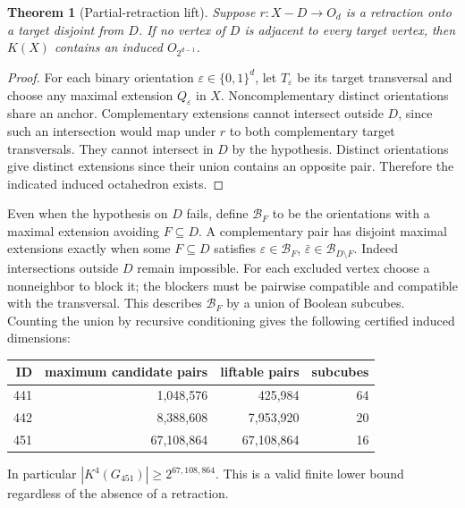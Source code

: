 \documentclass[11pt,a4paper]{article}
\newtheorem{theorem}{Theorem}[section]
\theoremstyle{definition}\newtheorem{definition}[theorem]{Definition}\newtheorem{example}[theorem]{Example}
\theoremstyle{remark}\newtheorem{remark}[theorem]{Remark}
\begin{document}
\begin{theorem}[Partial-retraction lift]\label{thm:partial}
Suppose \(r:X-D\to O_d\) is a retraction onto a target disjoint from \(D\). If no vertex of \(D\) is adjacent to every target vertex, then \(K(X)\) contains an induced \(O_{2^{d-1}}\).
\end{theorem}
\begin{proof}
For each binary orientation \(\varepsilon\in\{0,1\}^d\), let \(T_\varepsilon\) be its target transversal and choose any maximal extension \(Q_\varepsilon\) in \(X\). Noncomplementary distinct orientations share an anchor. Complementary extensions cannot intersect outside \(D\), since such an intersection would map under \(r\) to both complementary target transversals. They cannot intersect in \(D\) by the hypothesis. Distinct orientations give distinct extensions since their union contains an opposite pair. Therefore the indicated induced octahedron exists.
\end{proof}
Even when the hypothesis on \(D\) fails, define \(\mathcal B_F\) to be the orientations with a maximal extension avoiding \(F\subseteq D\). A complementary pair has disjoint maximal extensions exactly when some \(F\subseteq D\) satisfies \(\varepsilon\in\mathcal B_F\), \(\bar\varepsilon\in\mathcal B_{D\setminus F}\). Indeed intersections outside \(D\) remain impossible. For each excluded vertex choose a nonneighbor to block it; the blockers must be pairwise compatible and compatible with the transversal. This describes \(\mathcal B_F\) by a union of Boolean subcubes. Counting the union by recursive conditioning gives the following certified induced dimensions:
\begin{center}\begin{tabular}{rrrr}\toprule
ID& maximum candidate pairs&liftable pairs& subcubes\\\midrule
441&1,048,576&425,984&64\\
442&8,388,608&7,953,920&20\\
451&67,108,864&67,108,864&16\\\bottomrule\end{tabular}\end{center}
In particular \(|K^4(G_{451})|\ge 2^{67,108,864}\). This is a valid finite lower bound regardless of the absence of a retraction.
\end{document}
